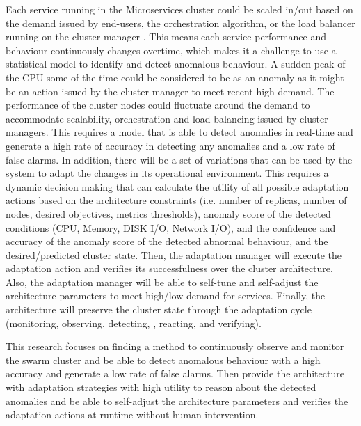 \documentclass[sigconf]{acmart}
\begin{document}
 Each service running in the Microservices cluster could be scaled in/out based on the demand issued by end-users, the orchestration algorithm, or the load balancer running on the cluster manager \cite{stubbs2015distributed}. This means each service performance and behaviour continuously changes overtime, which makes it a challenge to use a statistical model to identify and detect anomalous behaviour. A sudden peak of the CPU some of the time could be considered to be as an anomaly as it might be an action issued by the cluster manager to meet recent high demand. The performance of the cluster nodes could fluctuate around the demand to accommodate scalability, orchestration and load balancing issued by cluster managers. This requires a model that is able to detect anomalies in real-time and generate a high rate of accuracy in detecting any anomalies and a low rate of false alarms. In addition, there will be a set of variations that can be used by the system to adapt the changes in its operational environment. This requires a dynamic decision making that can calculate the utility of all possible adaptation actions based on the architecture constraints (i.e. number of replicas, number of nodes, desired objectives, metrics thresholds), anomaly score of the detected conditions (CPU, Memory, DISK I/O, Network I/O), and the confidence and accuracy of the anomaly score of the detected abnormal behaviour, and the desired/predicted cluster state. Then, the adaptation manager will execute the adaptation action and verifies its successfulness over the cluster architecture. Also, the adaptation manager will be able to self-tune and self-adjust the architecture parameters to meet high/low demand for services. Finally, the architecture will preserve the cluster state through the adaptation cycle (monitoring, observing, detecting, , reacting, and verifying).

 This research focuses on finding a method to continuously observe and monitor the swarm cluster and be able to detect anomalous behaviour with a high accuracy and generate a low rate of false alarms. Then provide the architecture with adaptation strategies with high utility to reason about the detected anomalies and be able to self-adjust the architecture parameters and verifies the adaptation actions at runtime without human intervention.
\end{document}
